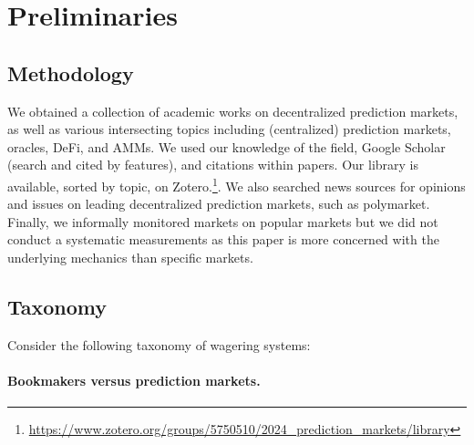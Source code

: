 \section{Preliminaries}

\subsection{Methodology}

We obtained a collection of academic works on decentralized prediction markets, as well as various intersecting topics including (centralized) prediction markets, oracles, DeFi, and AMMs. We used our knowledge of the field, Google Scholar (search and cited by features), and citations within papers. Our library is available, sorted by topic, on Zotero.\footnote{\url{https://www.zotero.org/groups/5750510/2024_prediction_markets/library}}. We also searched news sources for opinions and issues on leading decentralized prediction markets, such as polymarket. Finally, we informally monitored markets on popular markets but we did not conduct a systematic measurements as this paper is more concerned with the underlying mechanics than specific markets.


\subsection{Taxonomy}

Consider the following taxonomy of wagering systems:


\paragraph{Bookmakers versus prediction markets.}


